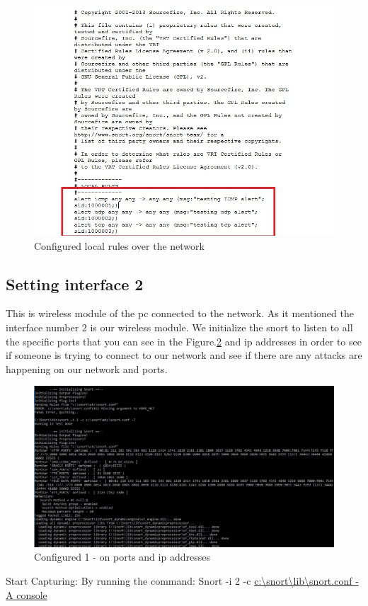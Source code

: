 \documentclass{article}
\begin{document}
\begin{figure}[H]
	\begin{center}
		\includegraphics[width=0.6
\textwidth]{Localnet.jpg}
	\end{center}
	\caption{Configured local rules over the network}
	\label{fig:Localnet}
\end{figure}






\subsection{Setting interface 2}
This is wireless module of the pc connected to the network. As it mentioned the interface number 2 is our wireless module. We initialize the snort to listen to all the specific ports that you can see in the Figure.\ref{fig:Ipport} and ip addresses in order to see if someone is trying to connect to our network and see if there are any attacks are happening on our network and ports.

\begin{figure}[H]
	\begin{center}
		\includegraphics[width=0.6
			\textwidth]{portip.jpg}
	\end{center}
	\caption{Configured 1 - on ports and ip addresses}
	\label{fig:Ipport}
\end{figure}


Start Capturing:
By running the command:
Snort -i 2 -c \url{c:\snort\lib\snort.conf -A console}
\end{document}
